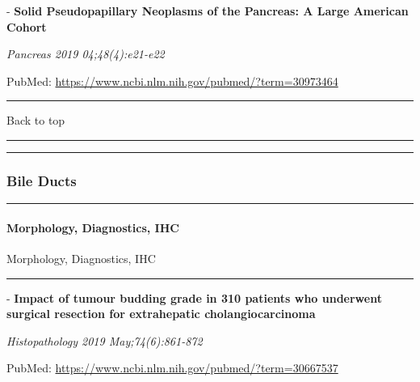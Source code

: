 \documentclass[]{article}
\let\oldparagraph\paragraph
\renewcommand{\paragraph}[1]{\oldparagraph{#1}\mbox{}}
\begin{document}
 - \textbf{Solid Pseudopapillary Neoplasms of the Pancreas: A Large
American Cohort}

\emph{Pancreas 2019 04;48(4):e21-e22}

PubMed: \url{https://www.ncbi.nlm.nih.gov/pubmed/?term=30973464}

{}

{}

\begin{center}\rule{0.5\linewidth}{\linethickness}\end{center}

Back to top

\begin{center}\rule{0.5\linewidth}{\linethickness}\end{center}

\pagebreak

\begin{center}\rule{0.5\linewidth}{\linethickness}\end{center}

\hypertarget{bile-ducts}{%
\subsubsection{Bile Ducts}\label{bile-ducts}}

\begin{center}\rule{0.5\linewidth}{\linethickness}\end{center}

\hypertarget{morphology-diagnostics-ihc-1}{%
\paragraph{Morphology, Diagnostics,
IHC}\label{morphology-diagnostics-ihc-1}}

Morphology, Diagnostics, IHC

\begin{center}\rule{0.5\linewidth}{\linethickness}\end{center}

 - \textbf{Impact of tumour budding grade in 310 patients who underwent
surgical resection for extrahepatic cholangiocarcinoma}

\emph{Histopathology 2019 May;74(6):861-872}

PubMed: \url{https://www.ncbi.nlm.nih.gov/pubmed/?term=30667537}
\end{document}
